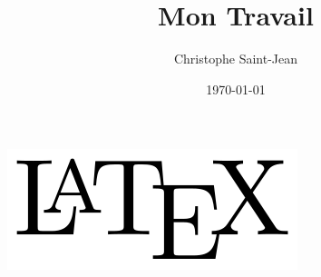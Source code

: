 \documentclass{book}
\title{Mon Travail}
\author{Christophe Saint-Jean}
\date{\today}
\begin{document}
\maketitle
\includegraphics{LaTeXLogo.png} %
\tableofcontents



\end{document}

